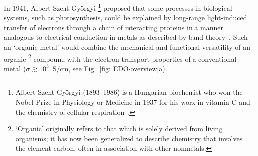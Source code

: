 In 1941, Albert Szent-Gy\"{o}rgyi%
\footnote{Albert Szent-Gy\"{o}rgyi (1893--1986) is a Hungarian biochemist
who won the Nobel Prize in Physiology or Medicine in 1937
for his work in vitamin C and the chemistry of cellular respiration~\cite{Nobel1922}.}%
proposed that some processes in biological systems, such as photosynthesis,
could be explained by long-range light-induced transfer of electrons
through a chain of interacting proteins in a manner analogous to electrical conduction in metals
as described by band theory~\cite{Szent1941, Szent1946}.
%
Such an `organic metal' would combine the mechanical and functional versatility of an organic%
\footnote{`Organic' originally refers to that which is solely derived from living organisms;
it has now been generalized to describe chemistry that involves the element carbon,
often in association with other nonmetals.}
compound with the electron transport properties of a conventional metal ($\sigma \gtrsim 10^3$~S/cm,
see Fig.~\ref{fig: EDO-overview}a).
%
